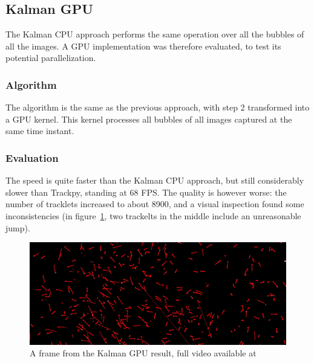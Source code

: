 \subsection{Kalman GPU}
\label{sec:link2d:kalman-gpu}

The Kalman CPU approach performs the same operation over all the bubbles of all the images.
A GPU implementation was therefore evaluated, to test its potential parallelization.

\subsubsection{Algorithm}

The algorithm is the same as the previous approach, with step 2 transformed into a GPU kernel.
This kernel processes all bubbles of all images captured at the same time instant.

\subsubsection{Evaluation}

The speed is quite faster than the Kalman CPU approach, but still considerably slower than Trackpy, standing at 68 FPS.
The quality is however worse: the number of tracklets increased to about 8900, and a visual inspection found some inconsistencies (in figure~\ref{fig:linkDD:kalmangpu}, two trackelts in the middle include an unreasonable jump).

\begin{figure}
	\centerline{\includegraphics[width=\locateimgsize]{images/link2d/kalman_GPU.png}}
	\caption{\centering A frame from the Kalman GPU \linkDD* result, full video available at~\cite{linkDD-kalman-gpu}}
	\label{fig:linkDD:kalmangpu}
\end{figure}
